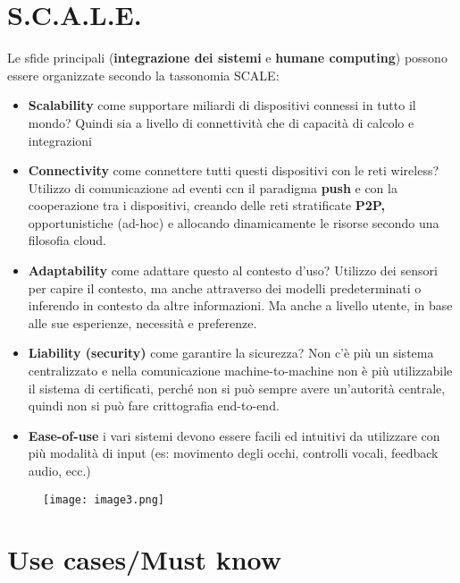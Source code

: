 \section{S.C.A.L.E.}
\label{s.c.a.l.e.}

Le sfide principali (\textbf{integrazione dei sistemi} e \textbf{humane
computing}) possono essere organizzate secondo la tassonomia SCALE:

\begin{itemize}
\item \textbf{Scalability} come supportare miliardi di dispositivi connessi
  in tutto il mondo? Quindi sia a livello di connettività che di
  capacità di calcolo e integrazioni

\item \textbf{Connectivity} come connettere tutti questi dispositivi con le
  reti wireless? Utilizzo di comunicazione ad eventi ccn il paradigma
  \textbf{push} e con la cooperazione tra i dispositivi, creando delle
  reti stratificate \textbf{P2P,} opportunistiche (ad-hoc) e allocando
  dinamicamente le risorse secondo una filosofia cloud.

\item \textbf{Adaptability} come adattare questo al contesto d'uso? Utilizzo
  dei sensori per capire il contesto, ma anche attraverso dei modelli
  predeterminati o inferendo in contesto da altre informazioni. Ma anche
  a livello utente, in base alle sue esperienze, necessità e preferenze.

\item \textbf{Liability (security)} come garantire la sicurezza? Non c'è più
  un sistema centralizzato e nella comunicazione machine-to-machine non
  è più utilizzabile il sistema di certificati, perché non si può sempre
  avere un'autorità centrale, quindi non si può fare crittografia
  end-to-end.

\item \textbf{Ease-of-use} i vari sistemi devono essere facili ed intuitivi
  da utilizzare con più modalità di input (es: movimento degli occhi,
  controlli vocali, feedback audio, ecc.)

\end{itemize}

\begin{figure}[H]
 \centering
 \texttt{[image: image3.png]}
\end{figure}



\section{Use cases/Must know}
\label{use-casesmust-know}

